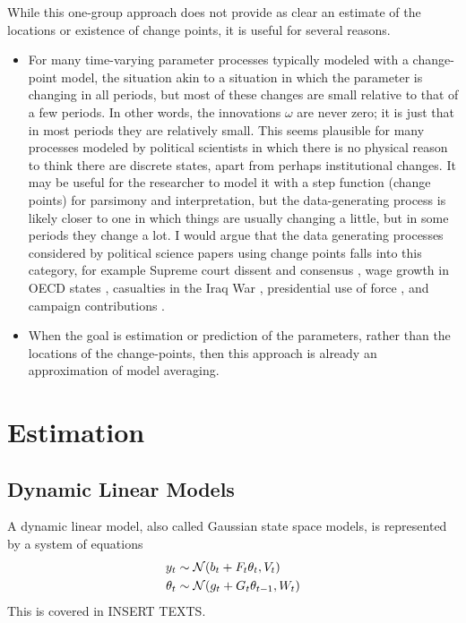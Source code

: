 While this one-group approach does not provide as clear an estimate of the locations or existence of change points, it is useful for several reasons.
\begin{itemize}
\item For many time-varying parameter processes typically modeled with a change-point model, the situation akin to a situation in which the parameter is changing in all periods, but most of these changes are small relative to that of a few periods.
  In other words, the innovations $\omega$ are never zero; it is just that in most periods they are relatively small.
  This seems plausible for many processes modeled by political scientists in which there is no physical reason to think there are discrete states, apart from perhaps institutional changes.
  It may be useful for the researcher to model it with a step function (change points) for parsimony and interpretation, but the data-generating process is likely closer to one in which things are usually changing a little, but in some periods they change a lot. 
  I would argue that the data generating processes considered by political science papers using change points falls into this category, for example Supreme court dissent and consensus \parencite{CalderiaZorn1998}, wage growth in OECD states \parencite{WesternKleykamp2004}, casualties in the Iraq War \parencite{Spirling2007a}, presidential use of force \parencite{Park2010}, and campaign contributions \parencite{Blackwell2012}.
\item When the goal is estimation or prediction of the parameters, rather than the locations of the change-points, then this approach is already an approximation of model averaging.
\end{itemize}

\section{Estimation}
\label{dlm:sec:estimation}



\subsection{Dynamic Linear Models}
\label{dlm:sec:dynam-line-models}

A dynamic linear model, also called Gaussian state space models, is represented by a system of equations
\begin{equation}
  \label{dlm:eq:4}
  \begin{aligned}[t]
  y_{t} &\sim \mathcal{N}\mathopen{}\left(b_{t} + F_{t} \theta_{t}, V_{t}\right)\mathclose{} \\
  \theta_{t} &\sim \mathcal{N}\mathopen{}\left(g_{t} + G_{t} \theta_{t - 1}, W_{t}\right)\mathclose{} 
  \end{aligned}
\end{equation}
This is covered in INSERT TEXTS.

